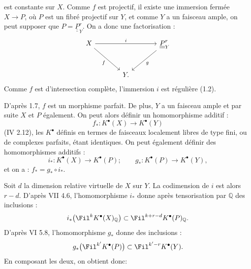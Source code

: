 
est constante sur $X$. Comme $f$ est projectif, il existe une immersion fermée $X\to P$, où $P$ est un fibré projectif sur $Y$, et comme $Y$ a un faisceau ample, on peut supposer que $P=\underline{\underline{P}}^r_Y$. On a donc une factorisation :
\[
\begin{tikzcd}[column sep=large,row sep=large]
X \arrow[rr,"i"] \arrow[dr,"f"'] && \underline{\underline{P}}^r_Y \arrow[dl,"g"]\\
& Y. &
\end{tikzcd}
\]
Comme $f$ est d'intersection complète, l'immersion $i$ est régulière (1.2).

D'après 1.7, $f$ est un morphisme parfait. De plus, $Y$ a un faisceau ample et par suite $X$ et $P$ également. On peut alors définir un homomorphisme additif :
\[
f_*:K^{\bullet}(X)\longrightarrow K^{\bullet}(Y)
\]
(IV 2.12), les $K^{\bullet}$ définis en termes de faisceaux localement libres de type fini, ou de complexes parfaits, étant identiques. On peut également définir des homomorphismes additifs :
\[
i_*:K^{\bullet}(X)\longrightarrow K^{\bullet}(P);
\qquad
 g_*:K^{\bullet}(P)\longrightarrow K^{\bullet}(Y),
\]
et on a : $f_*=g_*\circ i_*$.

Soit $d$ la dimension relative virtuelle de $X$ sur $Y$. La codimension de $i$ est alors $r-d$. D'après VII 4.6, l'homomorphisme $i_*$ donne après tensorisation par $\mathbb Q$ des inclusions :
\[
i_*\bigl(\Fil^kK^{\bullet}(X)_{\mathbb Q}\bigr)
\subset
\Fil^{k+r-d}K^{\bullet}(P)_{\mathbb Q}.
\]
D'après VI 5.8, l'homomorphisme $g_*$ donne des inclusions :
\[
g_*\bigl(\Fil^{k'}K^{\bullet}(P)\bigr)
\subset
\Fil^{k'-r}K^{\bullet}(Y).
\]
En composant les deux, on obtient donc:

